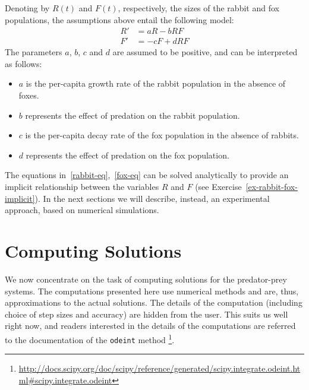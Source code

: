 Denoting by $R(t)$ and $F(t)$, respectively, the sizes of the rabbit and fox populations, the assumptions above entail the following model:
\begin{align}
\label{rabbit-eq}R'&=aR-bRF\\
\label{fox-eq}F'&=-cF+dRF
\end{align}
The parameters $a$, $b$, $c$ and $d$ are assumed to be positive, and can be interpreted as follows:
\begin{itemize}
\item $a$ is the per-capita growth rate of the rabbit population in the absence of foxes.
\item $b$ represents the effect of predation on the rabbit population.
\item $c$ is the per-capita decay rate of the fox population in the absence of rabbits.
\item $d$ represents the effect of predation on the fox population.
\end{itemize}
The equations in~\eqref{rabbit-eq},~\eqref{fox-eq} can be solved analytically to provide an implicit relationship between the variables $R$ and $F$ (see Exercise~\ref{ex-rabbit-fox-implicit}). In the next sections we will describe, instead, an experimental approach, based on numerical simulations.

\section{Computing Solutions}

We now concentrate on the task of computing solutions for the predator-prey systems. The computations presented here use numerical methods and are, thus, approximations to the actual solutions. The details of the computation (including choice of step sizes and accuracy) are hidden from the user. This suits us well right now, and readers interested in the details of the computations are referred to the documentation of the \texttt{odeint} method
\footnote{\url{http://docs.scipy.org/doc/scipy/reference/generated/scipy.integrate.odeint.html\#scipy.integrate.odeint}}.

